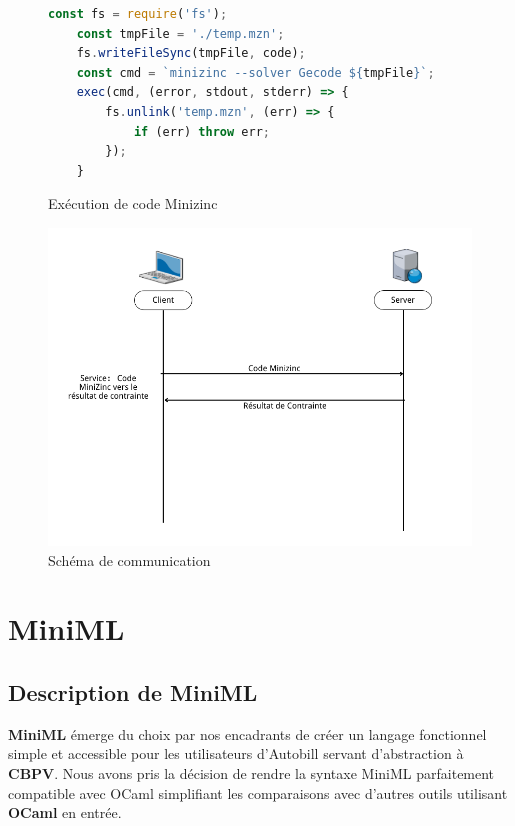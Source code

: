\documentclass[12pt]{article}
\begin{document}
\pagebreak

\begin{figure}[!b]
      \centering
      \begin{lstlisting}[language=javascript]
    const fs = require('fs');
    const tmpFile = './temp.mzn';
    fs.writeFileSync(tmpFile, code);
    const cmd = `minizinc --solver Gecode ${tmpFile}`;
    exec(cmd, (error, stdout, stderr) => {
        fs.unlink('temp.mzn', (err) => {
            if (err) throw err;
        });
    }
      \end{lstlisting}
      \caption{Exécution de code Minizinc}
\end{figure}
\hfill \break
\begin{figure}[!b]
      \centering
      \includegraphics[scale=0.4]{Figures/CommunicationMiniZinc.png}
      \caption{Schéma de communication}
\end{figure}


\pagebreak

\hypertarget{miniml}{%
      \section{MiniML}\label{miniml}}

\hypertarget{description-de-miniml}{%
      \subsection{Description de MiniML}\label{description-de-miniml}}

\textbf{MiniML} émerge du choix par nos encadrants de créer un langage
fonctionnel simple et accessible pour les utilisateurs d'Autobill
servant d'abstraction à \textbf{CBPV}. Nous avons pris la décision de rendre la syntaxe MiniML parfaitement
compatible avec OCaml simplifiant les comparaisons avec d'autres outils utilisant \textbf{OCaml} en entrée.
\end{document}
